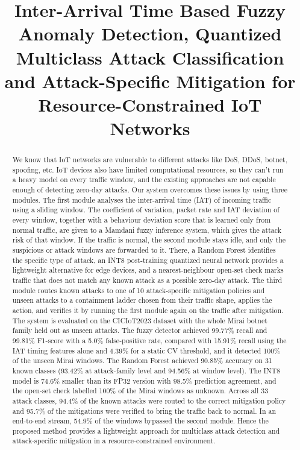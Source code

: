 \documentclass[]{interact}
\theoremstyle{plain}%
\theoremstyle{definition}
\theoremstyle{remark}
\begin{document}

\title{Inter-Arrival Time Based Fuzzy Anomaly Detection, Quantized Multiclass Attack Classification and Attack-Specific Mitigation for Resource-Constrained IoT Networks}

\author{
}

\maketitle

\begin{abstract}
We know that IoT networks are vulnerable to different attacks like DoS, DDoS, botnet, spoofing, etc. IoT devices also have limited computational resources, so they can't run a heavy model on every traffic window, and the existing approaches are not capable enough of detecting zero-day attacks. Our system overcomes these issues by using three modules. The first module analyses the inter-arrival time (IAT) of incoming traffic using a sliding window. The coefficient of variation, packet rate and IAT deviation of every window, together with a behaviour deviation score that is learned only from normal traffic, are given to a Mamdani fuzzy inference system, which gives the attack risk of that window. If the traffic is normal, the second module stays idle, and only the suspicious or attack windows are forwarded to it. There, a Random Forest identifies the specific type of attack, an INT8 post-training quantized neural network provides a lightweight alternative for edge devices, and a nearest-neighbour open-set check marks traffic that does not match any known attack as a possible zero-day attack. The third module routes known attacks to one of 10 attack-specific mitigation policies and unseen attacks to a containment ladder chosen from their traffic shape, applies the action, and verifies it by running the first module again on the traffic after mitigation. The system is evaluated on the CICIoT2023 dataset with the whole Mirai botnet family held out as unseen attacks. The fuzzy detector achieved 99.77\% recall and 99.81\% F1-score with a 5.0\% false-positive rate, compared with 15.91\% recall using the IAT timing features alone and 4.39\% for a static CV threshold, and it detected 100\% of the unseen Mirai windows. The Random Forest achieved 90.85\% accuracy on 31 known classes (93.42\% at attack-family level and 94.56\% at window level). The INT8 model is 74.6\% smaller than its FP32 version with 98.5\% prediction agreement, and the open-set check labelled 100\% of the Mirai windows as unknown. Across all 33 attack classes, 94.4\% of the known attacks were routed to the correct mitigation policy and 95.7\% of the mitigations were verified to bring the traffic back to normal. In an end-to-end stream, 54.9\% of the windows bypassed the second module. Hence the proposed method provides a lightweight approach for multiclass attack detection and attack-specific mitigation in a resource-constrained environment.

\end{abstract}
\end{document}
